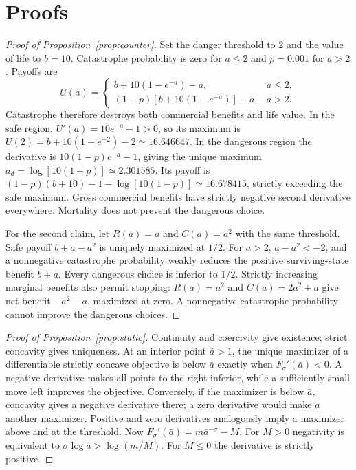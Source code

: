 \section{Proofs}\label{app:proofs}
\begin{proof}[Proof of Proposition~\ref{prop:counter}]
Set the danger threshold to $2$ and the value of life to $b=10$. Catastrophe probability is zero for $a\leq2$ and $p=0.001$ for $a>2$. Payoffs are
\[
 U(a)=\begin{cases}b+10(1-e^{-a})-a,&a\leq2,\\
 (1-p)[b+10(1-e^{-a})]-a,&a>2.
 \end{cases}
\]
Catastrophe therefore destroys both commercial benefits and life value. In the safe region, $U'(a)=10e^{-a}-1>0$, so its maximum is $U(2)=b+10(1-e^{-2})-2\simeq16.646647$. In the dangerous region the derivative is $10(1-p)e^{-a}-1$, giving the unique maximum $a_d=\log[10(1-p)]\simeq2.301585$. Its payoff is $(1-p)(b+10)-1-\log[10(1-p)]\simeq16.678415$, strictly exceeding the safe maximum. Gross commercial benefits have strictly negative second derivative everywhere. Mortality does not prevent the dangerous choice.

For the second claim, let $R(a)=a$ and $C(a)=a^2$ with the same threshold. Safe payoff $b+a-a^2$ is uniquely maximized at $1/2$. For $a>2$, $a-a^2<-2$, and a nonnegative catastrophe probability weakly reduces the positive surviving-state benefit $b+a$. Every dangerous choice is inferior to $1/2$. Strictly increasing marginal benefits also permit stopping: $R(a)=a^2$ and $C(a)=2a^2+a$ give net benefit $-a^2-a$, maximized at zero. A nonnegative catastrophe probability cannot improve the dangerous choices.
\end{proof}

\begin{proof}[Proof of Proposition~\ref{prop:static}]
Continuity and coercivity give existence; strict concavity gives uniqueness. At an interior point $\bar a>1$, the unique maximizer of a differentiable strictly concave objective is below $\bar a$ exactly when $F_\sigma'(\bar a)<0$. A negative derivative makes all points to the right inferior, while a sufficiently small move left improves the objective. Conversely, if the maximizer is below $\bar a$, concavity gives a negative derivative there; a zero derivative would make $\bar a$ another maximizer. Positive and zero derivatives analogously imply a maximizer above and at the threshold. Now $F_\sigma'(\bar a)=m\bar a^{-\sigma}-M$. For $M>0$ negativity is equivalent to $\sigma\log\bar a>\log(m/M)$. For $M\leq0$ the derivative is strictly positive.
\end{proof}

